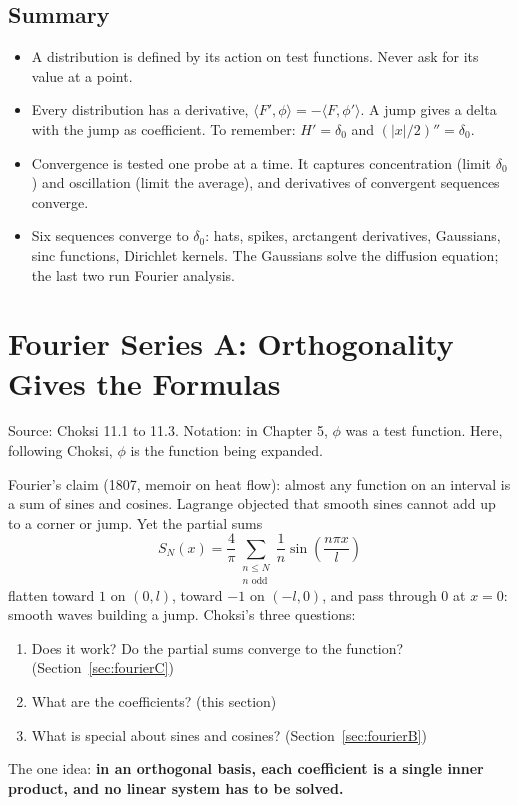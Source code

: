 \documentclass{article}
\newcommand{\ip}[2]{\langle #1, #2 \rangle}
\begin{document}
\subsection{Summary}
\begin{itemize}
    \item A distribution is defined by its action on test functions. Never ask for its value at a point.
    \item Every distribution has a derivative, $\ip{F'}{\phi} = -\ip{F}{\phi'}$. A jump gives a delta with the jump as coefficient. To remember: $H' = \delta_0$ and $(|x|/2)'' = \delta_0$.
    \item Convergence is tested one probe at a time. It captures concentration (limit $\delta_0$) and oscillation (limit the average), and derivatives of convergent sequences converge.
    \item Six sequences converge to $\delta_0$: hats, spikes, arctangent derivatives, Gaussians, sinc functions, Dirichlet kernels. The Gaussians solve the diffusion equation; the last two run Fourier analysis.
\end{itemize}


\section{Fourier Series A: Orthogonality Gives the Formulas}\label{sec:fourierA}
Source: Choksi 11.1 to 11.3. Notation: in Chapter 5, $\phi$ was a test function. Here, following Choksi, $\phi$ is the function being expanded.

Fourier's claim (1807, memoir on heat flow): almost any function on an interval is a sum of sines and cosines. Lagrange objected that smooth sines cannot add up to a corner or jump. Yet the partial sums
\begin{equation}
    S_N(x) = \frac{4}{\pi}\sum_{\substack{n \leq N \\ n \text{ odd}}} \frac{1}{n}\sin\left(\frac{n\pi x}{l}\right)
\end{equation}
flatten toward $1$ on $(0,l)$, toward $-1$ on $(-l,0)$, and pass through $0$ at $x = 0$: smooth waves building a jump. Choksi's three questions:
\begin{enumerate}[label=(\arabic*)]
    \item Does it work? Do the partial sums converge to the function? (Section~\ref{sec:fourierC})
    \item What are the coefficients? (this section)
    \item What is special about sines and cosines? (Section~\ref{sec:fourierB})
\end{enumerate}
The one idea: \textbf{in an orthogonal basis, each coefficient is a single inner product, and no linear system has to be solved.}
\end{document}

